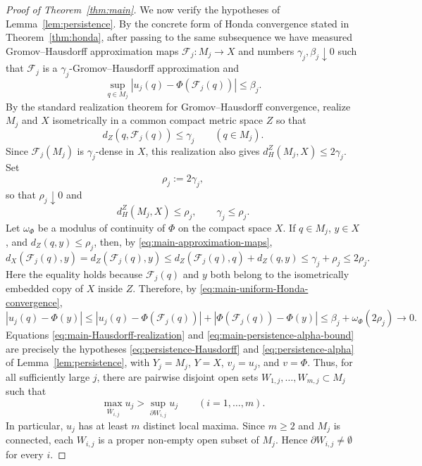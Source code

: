 \documentclass[11pt]{amsart}
\numberwithin{equation}{section}
\begin{document}
\begin{proof}[Proof of Theorem~\ref{thm:main}]
We now verify the hypotheses of Lemma~\ref{lem:persistence}.  By the concrete
form of Honda convergence stated in Theorem~\ref{thm:honda}, after passing to
the same subsequence we have measured Gromov--Hausdorff approximation maps
$\mathcal F_j:M_j\to X$ and numbers $\gamma_j,\beta_j\downarrow0$ such that
$\mathcal F_j$ is a $\gamma_j$-Gromov--Hausdorff approximation and
\begin{equation}\label{eq:main-uniform-Honda-convergence}
\sup_{q\in M_j}|u_j(q)-\Phi(\mathcal F_j(q))|\le \beta_j.
\end{equation}
By the standard realization theorem for Gromov--Hausdorff convergence, realize
$M_j$ and $X$ isometrically in a common compact metric space $Z$ so that
\begin{equation}\label{eq:main-approximation-maps}
d_Z(q,\mathcal F_j(q))\le \gamma_j
\qquad(q\in M_j).
\end{equation}
Since $\mathcal F_j(M_j)$ is $\gamma_j$-dense in $X$, this realization also gives
$d_H^Z(M_j,X)\le 2\gamma_j$.  Set
$$
\rho_j:=2\gamma_j,
$$
so that $\rho_j\downarrow0$ and
\begin{equation}\label{eq:main-Hausdorff-realization}
d_H^Z(M_j,X)\le \rho_j,
\qquad
\gamma_j\le \rho_j.
\end{equation}
Let $\omega_\Phi$ be a modulus of continuity of $\Phi$ on the compact space $X$.
If $q\in M_j$, $y\in X$, and $d_Z(q,y)\le\rho_j$, then, by
\eqref{eq:main-approximation-maps},
$$
d_X(\mathcal F_j(q),y)=d_Z(\mathcal F_j(q),y)
\le d_Z(\mathcal F_j(q),q)+d_Z(q,y)
\le \gamma_j+\rho_j
\le 2\rho_j.
$$
Here the equality holds because $\mathcal F_j(q)$ and $y$ both belong to the
isometrically embedded copy of $X$ inside $Z$.
Therefore, by \eqref{eq:main-uniform-Honda-convergence},
\begin{equation}\label{eq:main-persistence-alpha-bound}
|u_j(q)-\Phi(y)|
\le |u_j(q)-\Phi(\mathcal F_j(q))|+|\Phi(\mathcal F_j(q))-\Phi(y)|
\le \beta_j+\omega_\Phi(2\rho_j)\to0.
\end{equation}
Equations \eqref{eq:main-Hausdorff-realization} and
\eqref{eq:main-persistence-alpha-bound} are precisely the hypotheses
\eqref{eq:persistence-Hausdorff} and \eqref{eq:persistence-alpha} of
Lemma~\ref{lem:persistence}, with $Y_j=M_j$, $Y=X$, $v_j=u_j$, and $v=\Phi$.
Thus, for all sufficiently large $j$, there are pairwise disjoint open sets
$W_{1,j},\ldots,W_{m,j}\subset M_j$ such that
\begin{equation}\label{eq:main-boundary-gaps-on-pancake}
\max_{\overline W_{i,j}}u_j>
\sup_{\partial W_{i,j}}u_j
\qquad(i=1,\ldots,m).
\end{equation}
In particular, $u_j$ has at least $m$ distinct local maxima. Since $m\ge2$ and $M_j$ is connected, each $W_{i,j}$ is a proper non-empty
open subset of $M_j$. Hence $\partial W_{i,j}\ne\emptyset$ for every $i$.


\end{proof}
\end{document}
